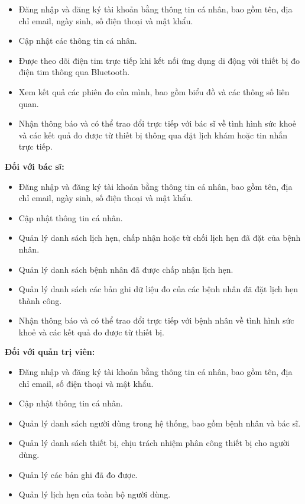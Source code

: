 \begin{adjustwidth}{1.5em}{}
	\begin{itemize}
		\item Đăng nhập và đăng ký tài khoản bằng thông tin cá nhân, bao gồm tên, địa chỉ email, ngày sinh, số điện thoại và mật khẩu.
		\item Cập nhật các thông tin cá nhân.
		\item Được theo dõi điện tim trực tiếp khi kết nối ứng dụng di động với thiết bị đo điện tim thông qua Bluetooth.
		\item Xem kết quả các phiên đo của mình, bao gồm biểu đồ và các thông số liên quan.
		\item Nhận thông báo và có thể trao đổi trực tiếp với bác sĩ về tình hình sức khoẻ và các kết quả đo được từ thiết bị thông qua đặt lịch khám hoặc tin nhắn trực tiếp.
	\end{itemize}
\end{adjustwidth}
\textbf{Đối với bác sĩ:}
\begin{adjustwidth}{1.5em}{}
	\begin{itemize}
		\item Đăng nhập và đăng ký tài khoản bằng thông tin cá nhân, bao gồm tên, địa chỉ email, ngày sinh, số điện thoại và mật khẩu.
		\item Cập nhật thông tin cá nhân.
		\item Quản lý danh sách lịch hẹn, chấp nhận hoặc từ chối lịch hẹn đã đặt của bệnh nhân.
		\item Quản lý danh sách bệnh nhân đã được chấp nhận lịch hẹn.
		\item Quản lý danh sách các bản ghi dữ liệu đo của các bệnh nhân đã đặt lịch hẹn thành công.
		\item Nhận thông báo và có thể trao đổi trực tiếp với bệnh nhân về tình hình sức khoẻ và các kết quả đo được từ thiết bị.
	\end{itemize}
\end{adjustwidth}
\textbf{Đối với quản trị viên:}
\begin{adjustwidth}{1.5em}{}
	\begin{itemize}
		\item Đăng nhập và đăng ký tài khoản bằng thông tin cá nhân, bao gồm tên, địa chỉ email, số điện thoại và mật khẩu.
		\item Cập nhật thông tin cá nhân.
		\item Quản lý danh sách người dùng trong hệ thống, bao gồm bệnh nhân và bác sĩ.
		\item Quản lý danh sách thiết bị, chịu trách nhiệm phân công thiết bị cho người dùng.
		\item Quản lý các bản ghi đã đo được.
		\item Quản lý lịch hẹn của toàn bộ người dùng.
	\end{itemize}
\end{adjustwidth}

